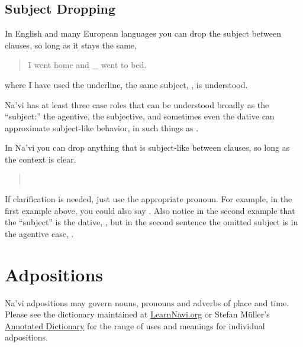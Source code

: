 \subsection{Subject Dropping} \label{subject-dropping}
In English and many European languages you can drop the subject
between clauses, so long as it stays the same,

\begin{quotation}
\noindent I went home and \_ went to bed.
\end{quotation}

\noindent where I have used the underline, the same subject, , is
understood.

Na'vi has at least three case roles that can be understood broadly as
the ``subject:'' the agentive, the subjective, and sometimes even the
dative can approximate subject-like behavior, in such things as
 .

In Na'vi you can drop anything that is subject-like between clauses,
so long as the context is clear.

\begin{quotation}
\noindent{} \\
\noindent{} 
\end{quotation}

\begin{quotation}
\noindent{}

\medskip
\noindent{}
\end{quotation}

\noindent If clarification is needed, just use the appropriate
pronoun.  For example, in the first example above, you could also
say .  Also notice in the second example that the
``subject'' is the dative, , but in the second sentence the
omitted subject is in the agentive case, . 


\section{Adpositions}
\noindent Na'vi adpositions may govern nouns, pronouns and adverbs
of place and time.  Please see the dictionary maintained at
\href{https://learnnavi.org/navi-vocabulary/}{LearnNavi.org} or Stefan
Müller's 
\href{https://forum.learnnavi.org/projects/an-annotated-dictionary-(draft)/}{Annotated Dictionary}
for the range of uses and meanings for individual adpositions.


